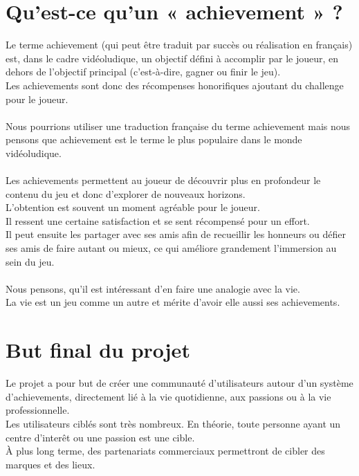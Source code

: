 \documentclass{life-fr}
\begin{document}
\section{Qu'est-ce qu'un « achievement » ?}
Le terme achievement (qui peut être traduit par succès ou réalisation en français) est, dans le cadre vidéoludique,  un objectif défini à accomplir par le joueur, en dehors de l’objectif principal (c’est-à-dire, gagner ou finir le jeu).\\
 Les achievements sont donc des récompenses honorifiques ajoutant du challenge pour le joueur.\\
\\
Nous pourrions utiliser une traduction française du terme achievement mais nous pensons que achievement est le terme le plus populaire dans le monde vidéoludique.\\
\\
Les achievements permettent au joueur de découvrir plus en profondeur le contenu du jeu et donc d’explorer de nouveaux horizons.\\
 L’obtention est souvent un moment agréable pour le joueur.\\
 Il ressent une certaine satisfaction et se sent récompensé pour un effort.\\
 Il peut ensuite les partager avec ses amis afin de recueillir les honneurs ou défier ses amis de faire autant ou mieux, ce qui améliore grandement l’immersion au sein du jeu.\\
\\
Nous pensons, qu’il est intéressant d’en faire une analogie avec la vie.\\
 La vie est un jeu comme un autre et mérite d’avoir elle aussi ses achievements.

\section{But final du projet}

Le projet a pour but de créer une communauté d'utilisateurs autour d'un système d'achievements, directement lié à la vie quotidienne, aux passions ou à la vie professionnelle.\\

Les utilisateurs ciblés sont très nombreux. En théorie, toute personne ayant un centre d'interêt ou une passion est une cible.\\

À plus long terme, des partenariats commerciaux permettront de cibler des marques et des lieux.\\
\end{document}
